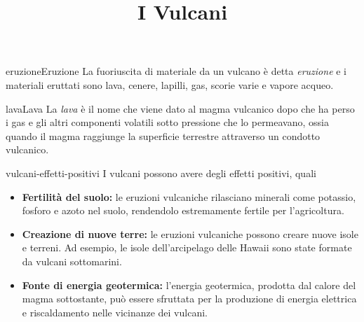 \documentclass[preview]{standalone}
\begin{document}
\title{I Vulcani}
\genpage

\begin{snippetdefinition}{eruzione}{Eruzione}
    La fuoriuscita di materiale da un vulcano è detta \textit{eruzione}
    e i materiali eruttati sono lava, cenere, lapilli, gas, scorie varie e vapore acqueo.
\end{snippetdefinition}


\begin{snippetdefinition}{lava}{Lava}
    La \textit{lava} è il nome che viene dato al magma vulcanico
    dopo che ha perso i gas e gli altri componenti volatili sotto pressione che lo permeavano,
    ossia quando il magma raggiunge la superficie terrestre attraverso un condotto vulcanico.
\end{snippetdefinition}


\begin{snippet}{vulcani-effetti-positivi}
    I vulcani possono avere degli effetti positivi, quali
    \begin{itemize}
        \item \textbf{Fertilità del suolo:} le eruzioni vulcaniche rilasciano minerali come potassio,
            fosforo e azoto nel suolo, rendendolo estremamente fertile per l'agricoltura.
        \item \textbf{Creazione di nuove terre:} le eruzioni vulcaniche possono creare nuove isole
            e terreni. Ad esempio, le isole dell'arcipelago delle Hawaii sono state formate
            da vulcani sottomarini.
        \item \textbf{Fonte di energia geotermica:} l'energia geotermica, prodotta dal calore
            del magma sottostante, può essere sfruttata per la produzione
            di energia elettrica e riscaldamento nelle vicinanze dei vulcani.
    \end{itemize}
\end{snippet}
\end{document}
